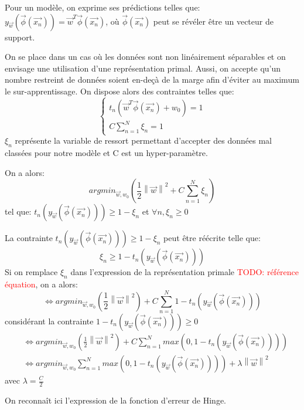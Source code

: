 Pour un modèle, on exprime ses prédictions telles que: $y_{\overrightarrow{w}}(\overrightarrow{\phi}(\overrightarrow{x_n})) = \overrightarrow{w}^T \overrightarrow{\phi}(\overrightarrow{x_n})$, où $\overrightarrow{\phi}(\overrightarrow{x_n})$ peut se révéler être un vecteur de support.

On se place dans un cas où les données sont non linéairement séparables et on envisage une utilisation d'une représentation primal. Aussi, on accepte qu'un nombre restreint de données soient en-deçà de la marge afin d'éviter au maximum le sur-apprentissage.
On dispose alors des contraintes telles que:
\begin{equation}
\begin{cases}
      t_n\left(\overrightarrow{w}^T \overrightarrow{\phi}(\overrightarrow{x_n}) + w_0\right) = 1 \\
      C \sum_{n=1}^N \xi_n = 1
\end{cases}       
\end{equation}
$\xi_n$ représente la variable de ressort permettant d'accepter des données mal classées pour notre modèle et C est un hyper-paramètre.

On a alors:
\begin{equation}
	argmin_{\overrightarrow{w}, w_0} \left(\frac{1}{2} \left\lVert\overrightarrow{w}\right\rVert^2 + C \sum_{n=1}^N \xi_n \right)
\end{equation}
tel que: $t_n\left(y_{\overrightarrow{w}}(\overrightarrow{\phi}(\overrightarrow{x_n}))\right) \geqslant 1 - \xi_n $ et $\forall n, \xi_n \geqslant 0 $

La contrainte $t_n\left(y_{\overrightarrow{w}}(\overrightarrow{\phi}(\overrightarrow{x_n}))\right) \geqslant 1 - \xi_n$ peut être réécrite telle que:
$$
\xi_n \geqslant 1 - t_n\left(y_{\overrightarrow{w}}(\overrightarrow{\phi}(\overrightarrow{x_n}))\right)
$$
Si on remplace $\xi_n$ dans l'expression de la représentation primale \textcolor{red}{TODO: référence équation}, on a alors:
\begin{equation}
	\iff argmin_{\overrightarrow{w}, w_0} \left(\frac{1}{2} \left\lVert\overrightarrow{w}\right\rVert^2 \right) + C \sum_{n=1}^N 1 - t_n\left(y_{\overrightarrow{w}}(\overrightarrow{\phi}(\overrightarrow{x_n}))\right)
\end{equation}
considérant la contrainte $1 - t_n\left(y_{\overrightarrow{w}}(\overrightarrow{\phi}(\overrightarrow{x_n}))\right) \geqslant 0$
\begin{equation}
\begin{split}
	&\iff argmin_{\overrightarrow{w}, w_0} \left(\frac{1}{2} \left\lVert\overrightarrow{w}\right\rVert^2 \right) + C \sum_{n=1}^N max\left(0, 1 - t_n\left(y_{\overrightarrow{w}}(\overrightarrow{\phi}(\overrightarrow{x_n}))\right)\right) \\
	&\iff argmin_{\overrightarrow{w}, w_0} \sum_{n=1}^N max\left(0, 1 - t_n\left(y_{\overrightarrow{w}}(\overrightarrow{\phi}(\overrightarrow{x_n}))\right)\right) + \lambda  \left\lVert\overrightarrow{w}\right\rVert^2
\end{split}
\end{equation}
avec $\lambda = \frac{C}{2}$

On reconnaît ici l'expression de la fonction d'erreur de Hinge.


